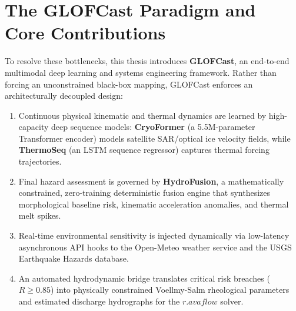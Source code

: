 \documentclass{mnnit}
\begin{document}
\section{The GLOFCast Paradigm and Core Contributions}
To resolve these bottlenecks, this thesis introduces \textbf{GLOFCast}, an end-to-end multimodal deep learning and systems engineering framework. Rather than forcing an unconstrained black-box mapping, GLOFCast enforces an architecturally decoupled design:
\begin{enumerate}
    \item Continuous physical kinematic and thermal dynamics are learned by high-capacity deep sequence models: \textbf{CryoFormer} (a 5.5M-parameter Transformer encoder) models satellite SAR/optical ice velocity fields, while \textbf{ThermoSeq} (an LSTM sequence regressor) captures thermal forcing trajectories.
    \item Final hazard assessment is governed by \textbf{HydroFusion}, a mathematically constrained, zero-training deterministic fusion engine that synthesizes morphological baseline risk, kinematic acceleration anomalies, and thermal melt spikes.
    \item Real-time environmental sensitivity is injected dynamically via low-latency asynchronous API hooks to the Open-Meteo weather service and the USGS Earthquake Hazards database.
    \item An automated hydrodynamic bridge translates critical risk breaches ($R \ge 0.85$) into physically constrained Voellmy-Salm rheological parameters and estimated discharge hydrographs for the $r.avaflow$ solver.
\end{enumerate}
\end{document}
